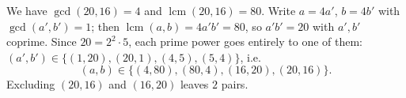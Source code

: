We have $\gcd(20,16)=4$ and $\operatorname{lcm}(20,16)=80$. Write $a=4a'$, $b=4b'$ with $\gcd(a',b')=1$; then $\operatorname{lcm}(a,b)=4a'b'=80$, so $a'b'=20$ with $a',b'$ coprime. Since $20=2^2\cdot5$, each prime power goes entirely to one of them: $(a',b')\in\{(1,20),(20,1),(4,5),(5,4)\}$, i.e.
\[(a,b)\in\{(4,80),(80,4),(16,20),(20,16)\}.\]
Excluding $(20,16)$ and $(16,20)$ leaves $\boxed{2}$ pairs.
